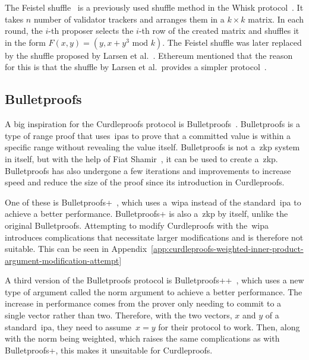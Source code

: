The Feistel shuffle~\cite{Feistle} is a previously used shuffle method in the Whisk protocol~\cite{Whisk2024}.
It takes $n$ number of validator trackers and arranges them in a $k\times k$ matrix.
In each round, the $i$-th proposer selects the $i$-th row of the created matrix and shuffles it in the form $F(x,y)=(y,x+y^3\text{ mod }k)$.
The Feistel shuffle was later replaced by the shuffle proposed by Larsen et al.~\cite{cryptoeprint:2022/560}.
Ethereum mentioned that the reason for this is that the shuffle by Larsen et al.\ provides a simpler protocol~\cite{Whisk2024}.

\subsection{Bulletproofs}\label{subsec:related-work-bulletproofs}
A big inspiration for the Curdleproofs protocol is Bulletproofs~\cite{bunz2018bulletproofs}.
Bulletproofs is a type of range proof that uses~\glspl{ipa} to prove that a committed value is within a specific range without revealing the value itself.
Bulletproofs is not a~\gls{zkp} system in itself, but with the help of Fiat Shamir~\cite{bunz2018bulletproofs}, it can be used to create a~\gls{zkp}.
Bulletproofs has also undergone a few iterations and improvements to increase speed and reduce the size of the proof since its introduction in Curdleproofs.

One of these is Bulletproofs+~\cite{chung2022bulletproofs+}, which uses a~\gls{wipa} instead of the standard~\gls{ipa} to achieve a better performance.
Bulletproofs+ is also a~\gls{zkp} by itself, unlike the original Bulletproofs.
Attempting to modify Curdleproofs with the~\gls{wipa} introduces complications that necessitate larger modifications and is therefore not suitable.
This can be seen in Appendix~\ref{app:curdleproofs-weighted-inner-product-argument-modification-attempt}

A third version of the Bulletproofs protocol is Bulletproofs++~\cite{eagen2024bulletproofs++}, which uses a new type of argument called the norm argument to achieve a better performance.
The increase in performance comes from the prover only needing to commit to a single vector rather than two.
Therefore, with the two vectors, $x$ and $y$ of a standard~\gls{ipa}, they need to assume~$x=y$ for their protocol to work.
Then, along with the norm being weighted, which raises the same complications as with Bulletproofs+, this makes it unsuitable for Curdleproofs.